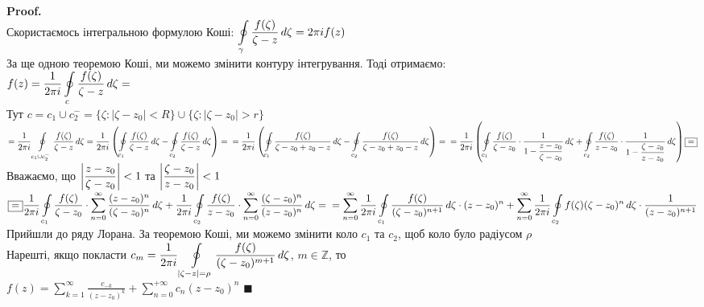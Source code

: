\documentclass[a4paper, 14pt]{extarticle}
\begin{document}
	\textbf{Proof.}\\
	Скористаємось інтегральною формулою Коші:
	$\displaystyle \oint\displaylimits_{\gamma} \frac{f(\zeta)}{\zeta-z}\,d\zeta = 2\pi i f(z)$\\
	За ще одною теоремою Коші, ми можемо змінити контуру інтегрування. Тоді отримаємо:\\
	$f(z) = \displaystyle \frac{1}{2\pi i} \oint\displaylimits_{c} \frac{f(\zeta)}{\zeta-z}\,d\zeta =$\\
	Тут $c = c_1 \cup c_2^- = \{\zeta: |\zeta-z_0|<R\} \cup \{\zeta: |\zeta-z_0|>r\}$\\
	 $ =\displaystyle\frac{1}{2\pi i}\oint\displaylimits_{c_1 \cup c_2^-} \frac{f(\zeta)}{\zeta-z}\,d\zeta = \frac{1}{2\pi i} \left(\oint\displaylimits_{c_1} \frac{f(\zeta)}{\zeta-z}\,d\zeta - \oint\displaylimits_{c_2} \frac{f(\zeta)}{\zeta-z}\,d\zeta \right) = \\ = \frac{1}{2\pi i} \left(\oint\displaylimits_{c_1} \frac{f(\zeta)}{\zeta-z_0+z_0-z}\,d\zeta - \oint\displaylimits_{c_2} \frac{f(\zeta)}{\zeta-z_0+z_0-z}\,d\zeta \right)=\\
	=\frac{1}{2\pi i} \left(\oint\displaylimits_{c_1} \frac{f(\zeta)}{\zeta-z_0} \cdot \frac{1}{1- \displaystyle\frac{z-z_0}{\zeta-z_0}}\,d\zeta + \oint\displaylimits_{c_2} \frac{f(\zeta)}{z-z_0} \cdot \frac{1}{1- \displaystyle\frac{\zeta-z_0}{z-z_0}}\,d\zeta \right) \boxed{=}$\\
	Вважаємо, що $\displaystyle \abs{\frac{z-z_0}{\zeta - z_0}}<1$ та $\displaystyle \abs{\frac{\zeta-z_0}{z-z_0}}<1$\\
	$\boxed{=} \displaystyle\frac{1}{2\pi i}\oint\displaylimits_{c_1} \frac{f(\zeta)}{\zeta-z_0} \cdot \sum_{n=0}^{\infty} \frac{(z-z_0)^n}{(\zeta-z_0)^n} \,d\zeta + \displaystyle\frac{1}{2\pi i}\oint\displaylimits_{c_2} \frac{f(\zeta)}{z-z_0} \cdot \sum_{n=0}^{\infty} \frac{(\zeta-z_0)^n}{(z-z_0)^n} \,d\zeta = 
	\\ = \sum_{n=0}^{\infty} \frac{1}{2\pi i}\oint\displaylimits_{c_1} \frac{f(\zeta)}{(\zeta - z_0)^{n+1}} \,d\zeta \cdot (z-z_0)^n + \sum_{n=0}^{\infty} \frac{1}{2\pi i}\oint\displaylimits_{c_2} f(\zeta)(\zeta-z_0)^n \,d\zeta \cdot \frac{1}{(z-z_0)^{n+1}}$\\
	Прийшли до ряду Лорана. За теоремою Коші, ми можемо змінити коло $c_1$ та $c_2$, щоб коло було радіусом $\rho$\\
	Нарешті, якщо покласти $c_m = \displaystyle\frac{1}{2\pi i}\oint\displaylimits_{|\zeta-z|=\rho} \frac{f(\zeta)}{(\zeta-z_0)^{m+1}} \,d\zeta$, $m \in \mathbb{Z}$, то\\ $f(z) = \displaystyle\sum_{k=1}^{\infty}\frac{c_{-k}}{(z-z_0)^k}  + \sum_{n=0}^{+\infty} c_n(z-z_0)^n$ $\blacksquare$
\end{document}
